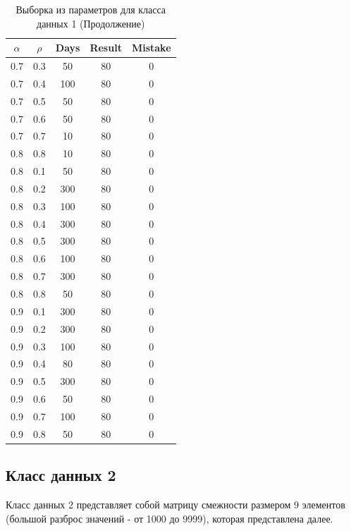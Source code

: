 \begin{center}
	\captionsetup{justification=raggedright,singlelinecheck=off}
	\begin{longtable}[c]{|c|c|c|c|c|}
		\caption{Выборка из параметров для класса данных 1 (Продолжение)\label{tbl:table_kd1-3}}\\ \hline
		$\alpha$ & $\rho$ & Days & Result & Mistake \\ \hline
		0.7 & 0.3 & 50 &   80 &    0 \\
		0.7 & 0.4 & 100 &   80 &    0 \\
		0.7 & 0.5 & 50 &   80 &    0 \\
		0.7 & 0.6 & 50 &   80 &    0 \\
		0.7 & 0.7 & 10 &   80 &    0 \\
		0.8 & 0.8 & 10 &  80 &    0 \\ \hline
		0.8 & 0.1 & 50 &   80 &    0 \\
		0.8 & 0.2 & 300 &   80 &    0 \\
		0.8 & 0.3 & 100 &   80 &    0 \\
		0.8 & 0.4 & 300 &   80 &    0 \\
		0.8 & 0.5 & 300 &   80 &    0 \\
		0.8 & 0.6 & 100 &   80 &    0 \\
		0.8 & 0.7 & 300 &   80 &    0 \\
		0.8 & 0.8 & 50 &  80 &    0 \\ \hline
		0.9 & 0.1 & 300 &   80 &    0 \\
		0.9 & 0.2 & 300 &   80 &    0 \\
		0.9 & 0.3 & 100 &   80 &    0 \\
		0.9 & 0.4 & 80 &   80 &    0 \\
		0.9 & 0.5 & 300 &   80 &    0 \\
		0.9 & 0.6 & 50 &   80 &    0 \\
		0.9 & 0.7 & 100 &   80 &    0 \\
		0.9 & 0.8 & 50 &  80 &    0 \\ \hline
	\end{longtable}
\end{center}

\clearpage

\subsection{Класс данных 2}\label{par:class2}

Класс данных 2 представляет собой матрицу смежности размером 9 элементов (большой разброс значений - от 1000 до 9999), которая представлена далее.

